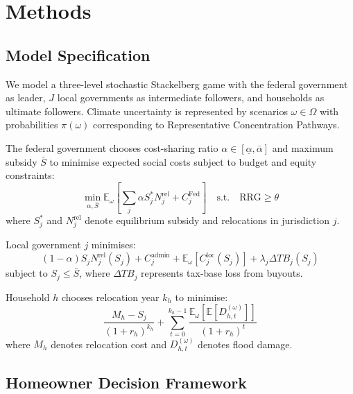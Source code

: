 \documentclass[preprint,12pt,authoryear]{elsarticle}
\begin{document}

\section{Methods}\label{sec:methods}

\subsection{Model Specification}

We model a three-level stochastic Stackelberg game with the federal government as leader, $J$ local governments as intermediate followers, and households as ultimate followers. Climate uncertainty is represented by scenarios $\omega \in \Omega$ with probabilities $\pi(\omega)$ corresponding to Representative Concentration Pathways.

The federal government chooses cost-sharing ratio $\alpha \in [\underline{\alpha}, \bar{\alpha}]$ and maximum subsidy $\bar{S}$ to minimise expected social costs subject to budget and equity constraints:
\begin{equation}
\min_{\alpha, \bar{S}} \mathbb{E}_\omega\left[\sum_{j} \alpha S_j^* N_j^{\text{rel}} + C_j^{\text{Fed}}\right] \quad \text{s.t.} \quad \text{RRG} \geq \theta
\label{eq:federal}
\end{equation}
where $S_j^*$ and $N_j^{\text{rel}}$ denote equilibrium subsidy and relocations in jurisdiction $j$.

Local government $j$ minimises:
\begin{equation}
(1-\alpha) S_j N_j^{\text{rel}}(S_j) + C_j^{\text{admin}} + \mathbb{E}_\omega[C_j^{\text{loc}}(S_j)] + \lambda_j \Delta TB_j(S_j)
\label{eq:local}
\end{equation}
subject to $S_j \leq \bar{S}$, where $\Delta TB_j$ represents tax-base loss from buyouts.

Household $h$ chooses relocation year $k_h$ to minimise:
\begin{equation}
\frac{M_h - S_j}{(1+r_h)^{k_h}} + \sum_{t=0}^{k_h-1} \frac{\mathbb{E}_\omega[\mathbb{E}[D_{h,t}^{(\omega)}]]}{(1+r_h)^t}
\label{eq:household}
\end{equation}
where $M_h$ denotes relocation cost and $D_{h,t}^{(\omega)}$ denotes flood damage.

\subsection{Homeowner Decision Framework}
\end{document}
